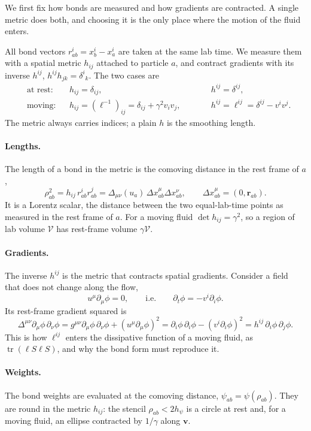 \documentclass[11pt,aps,preprint,nofootinbib,superscriptaddress,tightenlines]{revtex4-2}
\def\st{\begin{equation}}
\def\stp{\end{equation}}
\providecommand{\tr}{\operatorname{tr}}
\let\oldparagraph\paragraph
\renewcommand{\paragraph}{\par\medskip\oldparagraph}
\begin{document}
We first fix how bonds are measured and how gradients are contracted.  A
single metric does both, and choosing it is the only place where the motion of
the fluid enters.

All bond vectors $r^i_{ab}=x^i_b-x^i_a$ are taken at the same lab time.  We
measure them with a spatial metric $h_{ij}$ attached to particle $a$, and
contract gradients with its inverse $h^{ij}$, $h^{ij}h_{jk}=\delta^i{}_k$.  The two
cases are
\st
\begin{aligned}
&\text{at rest:} && h_{ij}=\delta_{ij}, && h^{ij}=\delta^{ij},\\
&\text{moving:} && h_{ij}=(\ell^{-1})_{ij}=\delta_{ij}+\gamma^2v_iv_j,\qquad && h^{ij}=\ell^{ij}=\delta^{ij}-v^iv^j .
\end{aligned}
\label{hmetric}
\stp
The metric always carries indices; a plain $h$ is the smoothing length.

\paragraph{Lengths.}  The length of a bond in the metric is the comoving distance
in the rest frame of $a$,
\st
\rho_{ab}^2=h_{ij}\,r^i_{ab}r^j_{ab}=\Delta_{\mu\nu}(u_a)\,\Delta x^\mu_{ab}\Delta x^\nu_{ab},
\qquad \Delta x^\mu_{ab}=(0,\bm r_{ab}) .
\stp
It is a Lorentz scalar, the distance between the two equal-lab-time points as
measured in the rest frame of $a$.  For a moving fluid $\det h_{ij}=\gamma^2$, so a
region of lab volume $\mathcal V$ has rest-frame volume $\gamma\mathcal V$.

\paragraph{Gradients.}  The inverse $h^{ij}$ is the metric that contracts spatial
gradients.  Consider a field that does not change along the flow,
\st
u^\mu\partial_\mu\phi=0,\qquad\text{i.e.}\qquad \partial_t\phi=-v^i\partial_i\phi .
\stp
Its rest-frame gradient squared is
\st
\Delta^{\mu\nu}\partial_\mu\phi\,\partial_\nu\phi
=g^{\mu\nu}\partial_\mu\phi\,\partial_\nu\phi+(u^\mu\partial_\mu\phi)^2
=\partial_i\phi\,\partial_i\phi-(v^i\partial_i\phi)^2
=h^{ij}\,\partial_i\phi\,\partial_j\phi .
\stp
This is how $\ell^{ij}$ enters the dissipative function of a moving fluid, as
$\tr(\ell S\ell S)$, and why the bond form must reproduce it.

\paragraph{Weights.}  The bond weights are evaluated at the comoving distance,
$\psi_{ab}=\psi(\rho_{ab})$.  They are round in the metric $h_{ij}$: the stencil
$\rho_{ab}<2h_\psi$ is a circle at rest and, for a moving fluid, an ellipse
contracted by $1/\gamma$ along $\bm v$.
\end{document}
